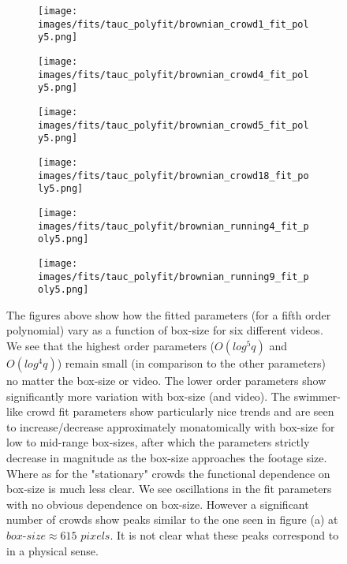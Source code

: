 \documentclass[10pt]{article}
\begin{document}
\begin{figure}[H]
\begin{subfigure}[t]{.5\textwidth}
  \centering
 \texttt{[image: images/fits/tauc\_polyfit/brownian\_crowd1\_fit\_poly5.png]}
  \caption{}
\end{subfigure}%
\hfill
\begin{subfigure}[t]{.5\textwidth}
  \centering
  \texttt{[image: images/fits/tauc\_polyfit/brownian\_crowd4\_fit\_poly5.png]}
  \caption{}
\end{subfigure}
\begin{subfigure}[t]{.5\textwidth}
  \centering
 \texttt{[image: images/fits/tauc\_polyfit/brownian\_crowd5\_fit\_poly5.png]}
  \caption{}
\end{subfigure}%
\hfill
\begin{subfigure}[t]{.5\textwidth}
  \centering
  \texttt{[image: images/fits/tauc\_polyfit/brownian\_crowd18\_fit\_poly5.png]}
  \caption{}
\end{subfigure}
\begin{subfigure}[t]{.5\textwidth}
  \centering
 \texttt{[image: images/fits/tauc\_polyfit/brownian\_running4\_fit\_poly5.png]}
  \caption{}
\end{subfigure}%
\hfill
\begin{subfigure}[t]{.5\textwidth}
  \centering
  \texttt{[image: images/fits/tauc\_polyfit/brownian\_running9\_fit\_poly5.png]}
  \caption{}
\end{subfigure}
\caption{The figures above show how the fitted parameters (for a fifth order polynomial) vary as a function of box-size for six different videos. We see that the highest order parameters ($O(log^5q)$ and $O(log^4q)$) remain small (in comparison to the other parameters) no matter the box-size or video. The lower order parameters show significantly more variation with box-size (and video). The swimmer-like crowd fit parameters show particularly nice trends and are seen to increase/decrease approximately monatomically with box-size for low to mid-range box-sizes, after which the parameters strictly decrease in magnitude as the box-size approaches the footage size. Where as for the "stationary" crowds the functional dependence on box-size is much less clear. We see oscillations in the fit parameters with no obvious dependence on box-size. However a significant number of crowds show peaks similar to the one seen in figure (a) at $box$-$size \approx 615$ $pixels$. It is not clear what these peaks correspond to in a physical sense. }
\label{fig:tauc_polyfit_params}
\end{figure}
\end{document}
